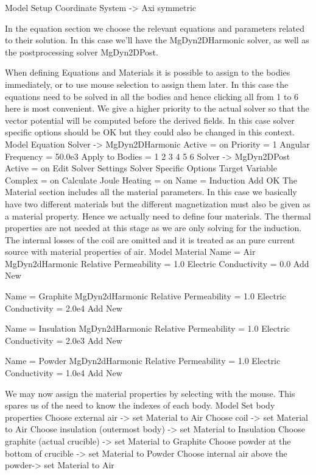 \ttbegin
Model
  Setup  
    Coordinate System -> Axi symmetric
\ttend
 
In the equation section we choose the relevant equations and parameters related to their solution. 
In this case we'll have the MgDyn2DHarmonic solver, as well as the postprocessing solver MgDyn2DPost.

When defining Equations and Materials it is possible to assign to the bodies immediately, or to use mouse
selection to assign them later. In this case the equations need to be solved in all the bodies and 
hence clicking all from 1 to 6 here is most convenient. We give a higher priority to the actual solver
so that the vector potential will be computed before the derived fields. 
In this case solver specific options should be OK but they could also be changed in this context.
\ttbegin
Model
  Equation
	Solver -> MgDyn2DHarmonic
      Active = on
      Priority = 1
      Angular Frequency = 50.0e3
      Apply to Bodies = 1 2 3 4 5 6
    Solver -> MgDyn2DPost
      Active = on
      Edit Solver Settings
        Solver Specific Options
          Target Variable Complex = on
          Calculate Joule Heating = on
    Name = Induction
    Add 
    OK
\ttend        
The Material section includes all the material parameters. In this case we basically have two 
different materials but the different magnetization must also be given as a material property.
Hence we actually need to define four materials. The thermal properties are not needed at this stage as 
we are only solving for the induction. The internal losses of the coil are omitted and it is treated as an
pure current source with material properties of air.  
\ttbegin
Model
  Material
    Name = Air
    MgDyn2dHarmonic
      Relative Permeability = 1.0
      Electric Conductivity = 0.0
    Add
    New
	
    Name = Graphite
    MgDyn2dHarmonic
      Relative Permeability = 1.0
      Electric Conductivity = 2.0e4
    Add
    New

    Name = Insulation
    MgDyn2dHarmonic
      Relative Permeability = 1.0
      Electric Conductivity = 2.0e3
    Add
    New

    Name = Powder
    MgDyn2dHarmonic
      Relative Permeability = 1.0
      Electric Conductivity = 1.0e4
    Add
    New
\ttend

We may now assign the material properties by selecting with the mouse.
This spares us of the need to know the indexes of each body.
\ttbegin
Model
  Set body properties
    Choose external air -> set Material to Air
    Choose coil -> set Material to Air
    Choose insulation (outermost body) -> set Material to Insulation
    Choose graphite (actual crucible) -> set Material to Graphite
    Choose powder at the bottom of crucible -> set Material to Powder
    Choose internal air above the powder-> set Material to Air
\ttend

